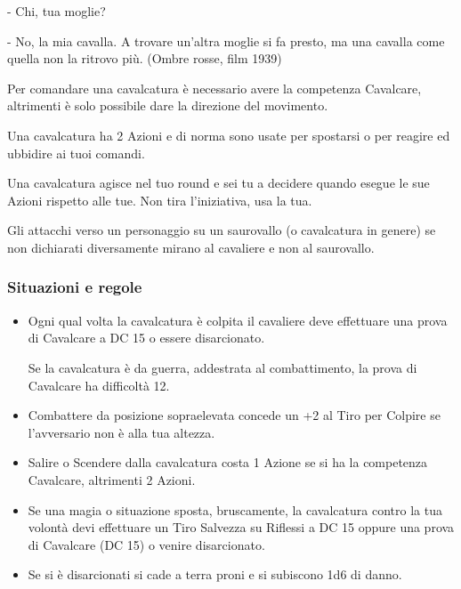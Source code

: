 \begin{multicols}{2}
\begin{changemargin}{0.3cm}{0.3cm}
\begin{enfasi}
{- Chi, tua moglie?

- No, la mia cavalla. A trovare un'altra moglie si fa presto, ma una cavalla come quella non la ritrovo più. (Ombre rosse, film 1939)}\end{enfasi}\end{changemargin}\medskip

Per comandare una cavalcatura è necessario avere la competenza Cavalcare, altrimenti è solo possibile dare la direzione del movimento.

Una cavalcatura ha 2 Azioni e di norma sono usate per spostarsi o per reagire ed ubbidire ai tuoi comandi.

Una cavalcatura agisce nel tuo round e sei tu a decidere quando esegue le sue Azioni rispetto alle tue. Non tira l'iniziativa, usa la tua.

Gli attacchi verso un personaggio su un saurovallo (o cavalcatura in genere) se non dichiarati diversamente mirano al cavaliere e non al saurovallo.

\subsubsection{Situazioni e regole}\label{cavallosituazioniregole}

\begin{itemize}[leftmargin=*] \setlength{\itemsep}{0pt}
\item
Ogni qual volta la cavalcatura è colpita il cavaliere deve effettuare una prova di Cavalcare a DC 15 o essere disarcionato.

Se la cavalcatura è da guerra, addestrata al combattimento, la prova di Cavalcare ha difficoltà 12.

\item
Combattere da posizione sopraelevata concede un +2 al Tiro per Colpire se l'avversario non è alla tua altezza.

\item
Salire o Scendere dalla cavalcatura costa 1 Azione se si ha la competenza Cavalcare, altrimenti 2 Azioni.

\item
Se una magia o situazione sposta, bruscamente, la cavalcatura contro la tua volontà devi effettuare un Tiro Salvezza su Riflessi a DC 15 oppure una prova di Cavalcare (DC 15) o venire disarcionato.

\item
Se si è disarcionati si cade a terra proni e si subiscono 1d6 di danno.
\end{itemize}


\end{multicols}
